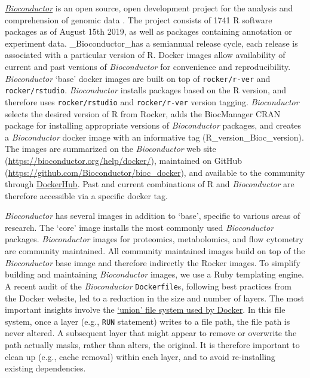 \href{http://bioconductor.org/}{\emph{Bioconductor}} is an open source,
open development project for the analysis and comprehension of genomic
data \citep{gentleman_bioconductor_2004}. The project consists of 1741 R
software packages as of August 15th 2019, as well as packages containing
annotation or experiment data. \_Bioconductor\_has a semiannual release
cycle, each release is associated with a particular version of R. Docker
images allow availability of current and past versions of
\emph{Bioconductor} for convenience and reproducibility.
\emph{Bioconductor} `base' docker images are built on top of
\texttt{rocker/r-ver} and \texttt{rocker/rstudio}. \emph{Bioconductor}
installs packages based on the R version, and therefore uses
\texttt{rocker/rstudio} and \texttt{rocker/r-ver} version tagging.
\emph{Bioconductor} selects the desired version of R from Rocker, adds
the BiocManager CRAN package for installing appropriate versions of
\emph{Bioconductor} packages, and creates a \emph{Bioconductor} docker
image with an informative tag (R\_version\_Bioc\_version). The images
are summarized on the \emph{Bioconductor} web site
(\url{https://bioconductor.org/help/docker/}), maintained on GitHub
(\url{https://github.com/Bioconductor/bioc_docker}), and available to
the community through \href{https://hub.docker.com/}{DockerHub}. Past
and current combinations of R and \emph{Bioconductor} are therefore
accessible via a specific docker tag.

\emph{Bioconductor} has several images in addition to `base', specific
to various areas of research. The `core' image installs the most
commonly used \emph{Bioconductor} packages. \emph{Bioconductor} images
for proteomics, metabolomics, and flow cytometry are community
maintained. All community maintained images build on top of the
\emph{Bioconductor} base image and therefore indirectly the Rocker
images. To simplify building and maintaining \emph{Bioconductor} images,
we use a Ruby templating engine. A recent audit of the
\emph{Bioconductor} \texttt{Dockerfile}s, following best practices from
the Docker website, led to a reduction in the size and number of layers.
The most important insights involve the
\href{https://docs.docker.com/storage/storagedriver/overlayfs-driver/\#how-container-reads-and-writes-work-with-overlay-or-overlay2}{`union'
file system used by Docker}. In this file system, once a layer (e.g.,
\texttt{RUN} statement) writes to a file path, the file path is never
altered. A subsequent layer that might appear to remove or overwrite the
path actually masks, rather than alters, the original. It is therefore
important to clean up (e.g., cache removal) within each layer, and to
avoid re-installing existing dependencies.


